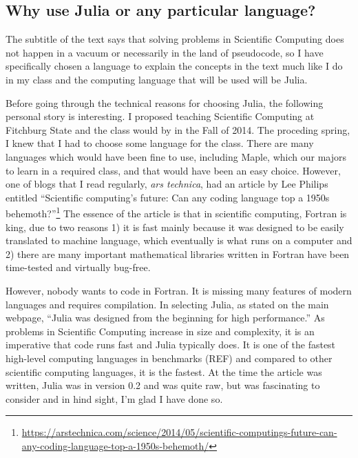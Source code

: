 \subsection*{Why use Julia or any particular language?} 

The subtitle of the text says that solving problems in Scientific Computing does not happen in a vacuum or necessarily in the land of pseudocode, so I have specifically chosen a language to explain the concepts in the text much like I do in my class and the computing language that will be used will be Julia.  

Before going through the technical reasons for choosing Julia, the following personal story is interesting.  I proposed teaching Scientific Computing at Fitchburg State and the class would by in the Fall of 2014.  The proceding spring, I knew that I had to choose some language for the class.  There are many languages which would have been fine to use, including Maple, which our majors to learn in a required class, and that would have been an easy choice. However, one of blogs that I read regularly, \emph{ars technica}, had an article by Lee Philips entitled ``Scientific computing's future: Can any coding language top a 1950s behemoth?''\footnote{\href{https://arstechnica.com/science/2014/05/scientific-computings-future-can-any-coding-language-top-a-1950s-behemoth/}{https://arstechnica.com/science/2014/05/scientific-computings-future-can-any-coding-language-top-a-1950s-behemoth/}}  The essence of the article is that in scientific computing, Fortran is king, due to two reasons 1) it is fast mainly because it was designed to be easily translated to machine language, which eventually is what runs on a computer and 2) there are many important mathematical libraries written in Fortran have been time-tested and virtually bug-free. 

However, nobody wants to code in Fortran.  It is missing many features of modern languages and requires compilation.  In selecting Julia, as stated on the main webpage, ``Julia was designed from the beginning for high performance.''  As problems in Scientific Computing increase in size and complexity, it is an imperative that code runs fast and Julia typically does.  It is one of the fastest high-level computing languages in benchmarks (REF) and compared to other scientific computing languages, it is the fastest. At the time the article was written, Julia was in version 0.2 and was quite raw, but was fascinating to consider and in hind sight, I'm glad I have done so.  

